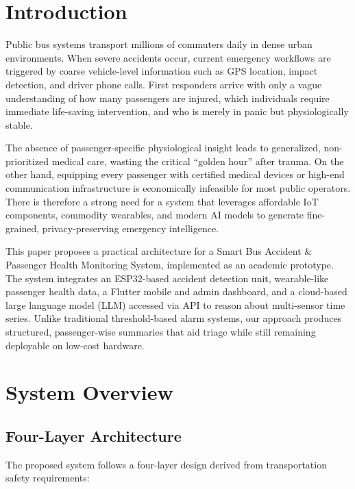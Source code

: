 \documentclass[conference]{IEEEtran}
\begin{document}
\section{Introduction}

Public bus systems transport millions of commuters daily in dense urban environments.
When severe accidents occur, current emergency workflows are triggered by coarse vehicle-level information such as GPS location, impact detection, and driver phone calls.
First responders arrive with only a vague understanding of how many passengers are injured, which individuals require immediate life-saving intervention, and who is merely in panic but physiologically stable.

The absence of passenger-specific physiological insight leads to generalized, non-prioritized medical care, wasting the critical ``golden hour'' after trauma.
On the other hand, equipping every passenger with certified medical devices or high-end communication infrastructure is economically infeasible for most public operators.
There is therefore a strong need for a system that leverages affordable IoT components, commodity wearables, and modern AI models to generate fine-grained, privacy-preserving emergency intelligence.

This paper proposes a practical architecture for a Smart Bus Accident \& Passenger Health Monitoring System, implemented as an academic prototype.
The system integrates an ESP32-based accident detection unit, wearable-like passenger health data, a Flutter mobile and admin dashboard, and a cloud-based large language model (LLM) accessed via API to reason about multi-sensor time series.
Unlike traditional threshold-based alarm systems, our approach produces structured, passenger-wise summaries that aid triage while still remaining deployable on low-cost hardware.

\section{System Overview}

\subsection{Four-Layer Architecture}

The proposed system follows a four-layer design derived from transportation safety requirements:
\end{document}
